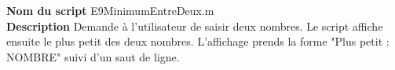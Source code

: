 \textbf{Nom du script}
E9MinimumEntreDeux.m\\
\textbf{Description}
Demande à l'utilisateur de saisir deux nombres. Le script affiche ensuite le plus petit des deux nombres. L'affichage prends la forme "Plus petit : NOMBRE" suivi d'un saut de ligne.